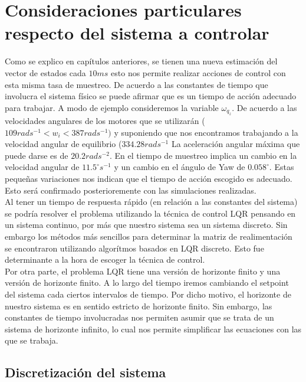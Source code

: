 \documentclass[main]{subfiles}
\begin{document}
\section{Consideraciones particulares respecto del sistema a controlar}

Como se explico en cap\'itulos anteriores, se tienen una nueva estimaci\'on del vector de estados cada $10 ms$ esto nos permite realizar acciones de control con esta misma tasa de muestreo. De acuerdo a las constantes de tiempo que involucra el sistema f\'isico se puede afirmar que es un tiempo de acci\'on adecuado para trabajar. A modo de ejemplo consideremos la variable $\omega_{q_z}$. De acuerdo a las velocidades angulares de los motores que se utilizar\'an ($109 rads^{-1} < w_i < 387 rads^{-1})$ y suponiendo que nos encontramos trabajando a la velocidad angular de equilibrio ($334.28 rads^{-1}$ La aceleraci\'on angular m\'axima que puede darse es de $20.2 rad s^{-2}$. En el tiempo de muestreo implica un cambio en la velocidad angular de $11.5 ^{\circ} s^{-1}$ y un cambio en el \'angulo de Yaw de $0.058^{\circ}$. Estas pequeñas variaciones nos indican que el tiempo de acci\'on escogido es adecuado. Esto ser\'a confirmado posterioremente con las simulaciones realizadas. \\

Al tener un tiempo de respuesta r\'apido (en relaci\'on a las constantes del sistema) se podr\'ia resolver el problema utilizando la t\'ecnica de control LQR pensando en un sistema continuo, por m\'as que nuestro sistema sea un sistema discreto. Sin embargo los m\'etodos m\'as sencillos para determinar la matriz de realimentaci\'on se encontraron utilizando algor\'itmos basados en LQR discreto. Esto fue determinante a la hora de escoger la t\'ecnica de control.\\

Por otra parte, el problema LQR tiene una versi\'on de horizonte finito y una versi\'on de horizonte finito. A lo largo del tiempo iremos cambiando el setpoint del sistema cada ciertos intervalos de tiempo. Por dicho motivo, el horizonte de nuestro sistema es en sentido estricto de horizonte finito. Sin embargo, las constantes de tiempo involucradas nos permiten asumir que se trata de un sistema de horizonte infinito, lo cual nos permite simplificar las ecuaciones con las que se trabaja.\\

\subsection{Discretizaci\'on del sistema}
\end{document}

